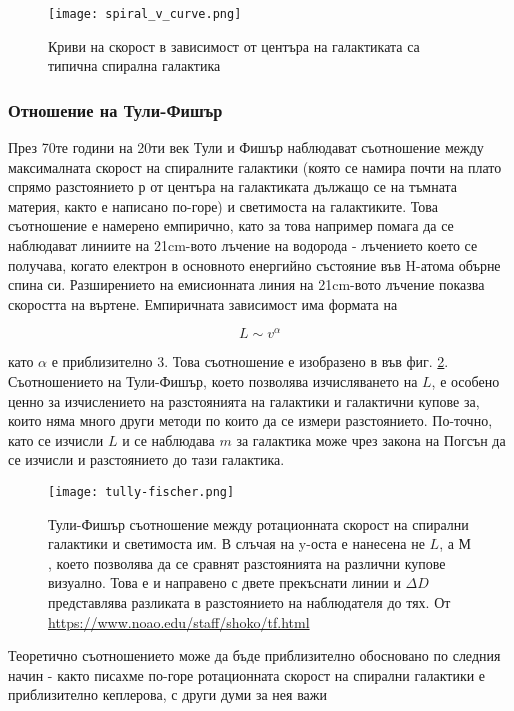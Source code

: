 \documentclass[a4paper,12pt]{article}
\begin{document}
\begin{figure}[h!]
\centering
\texttt{[image: spiral\_v\_curve.png]}
\caption{Криви на скорост в зависимост от центъра на галактиката са типична спирална галактика}
\label{fig:spiral_v_curve}
\end{figure}

\subsubsection{Отношение на Тули-Фишър}
През 70те години на 20ти век Тули и Фишър наблюдават съотношение между максималната скорост на спиралните галактики (която се намира почти на плато спрямо разстоянието $р$ от центъра на галактиката дължащо се на тъмната материя, както е написано по-горе) и светимоста на галактиките. Това съотношение е намерено емпирично, като за това например помага да се наблюдават линиите на 21cm-вото лъчение на водорода - лъчението което се получава, когато електрон в основното енергийно състояние във H-атома обърне спина си. Разширението на емисионната линия на 21cm-вото лъчение показва скоростта на въртене. Емпиричната зависимост има формата на 

\begin{equation}
    L \sim v^{\alpha}
\end{equation}

като $\alpha$ е приблизително 3. Това съотношение е изобразено в във фиг. \ref{fig:tully-fischer}. Съотношението на Тули-Фишър, което позволява изчисляването на $L$, е особено ценно за изчислението на разстоянията на галактики и галактични купове за, които няма много други методи по които да се измери разстоянието. По-точно, като се изчисли $L$ и се наблюдава $m$ за галактика може чрез закона на Погсън да се изчисли и разстоянието до тази галактика.

\begin{figure}[h!]
\centering
\texttt{[image: tully-fischer.png]}
\caption{Тули-Фишър съотношение между ротационната скорост на спирални галактики и светимоста им. В слъчая на y-оста е нанесена не $L$, а $М$, което позволява да се сравнят разстоянията на различни купове визуално. Това е и направено с двете прекъснати линии и $\Delta D$ представлява разликата в разстоянието на наблюдателя до тях. От \url{https://www.noao.edu/staff/shoko/tf.html}}
\label{fig:tully-fischer}
\end{figure}

Теоретично съотношението може да бъде приблизително обосновано по следния начин - както писахме по-горе ротационната скорост на спирални галактики е приблизително кеплерова, с други думи за нея важи
\end{document}
